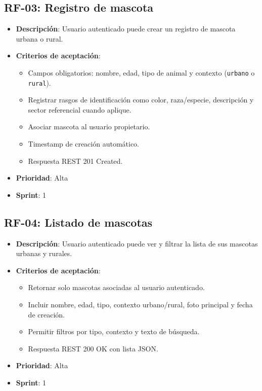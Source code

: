 \documentclass[12pt,a4paper]{article}
\begin{document}
\subsection{RF-03: Registro de mascota}
\begin{itemize}[leftmargin=*]
    \item \textbf{Descripci\'on}: Usuario autenticado puede crear un registro de mascota urbana o rural.
    \item \textbf{Criterios de aceptaci\'on}:
    \begin{itemize}[leftmargin=*]
        \item Campos obligatorios: nombre, edad, tipo de animal y contexto (\texttt{urbano} o \texttt{rural}).
        \item Registrar rasgos de identificaci\'on como color, raza/especie, descripci\'on y sector referencial cuando aplique.
        \item Asociar mascota al usuario propietario.
        \item Timestamp de creaci\'on autom\'atico.
        \item Respuesta REST 201 Created.
    \end{itemize}
    \item \textbf{Prioridad}: Alta
    \item \textbf{Sprint}: 1
\end{itemize}

\subsection{RF-04: Listado de mascotas}
\begin{itemize}[leftmargin=*]
    \item \textbf{Descripci\'on}: Usuario autenticado puede ver y filtrar la lista de sus mascotas urbanas y rurales.
    \item \textbf{Criterios de aceptaci\'on}:
    \begin{itemize}[leftmargin=*]
        \item Retornar solo mascotas asociadas al usuario autenticado.
        \item Incluir nombre, edad, tipo, contexto urbano/rural, foto principal y fecha de creaci\'on.
        \item Permitir filtros por tipo, contexto y texto de b\'usqueda.
        \item Respuesta REST 200 OK con lista JSON.
    \end{itemize}
    \item \textbf{Prioridad}: Alta
    \item \textbf{Sprint}: 1
\end{itemize}
\end{document}

